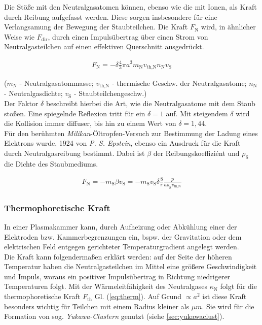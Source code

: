 \documentclass[numbers=noenddot,a4paper]{scrartcl}
\newcommand{\ix}[1]{_\text{#1}}
\newcommand{\tilt}[1]{\textit{#1}}
\begin{document}
				Die Stöße mit den Neutralgasatomen können, ebenso wie die mit Ionen, als Kraft durch Reibung aufgefasst werden. Diese sorgen insbesondere für eine Verlangsamung der Bewegung der Staubteilchen. Die Kraft $F\ix{N}$ wird, in ähnlicher Weise wie $F\ix{dir}$, durch einen Impulsübertrag über einen Strom von Neutralgasteilchen auf einen effektiven Querschnitt ausgedrückt.
				
					\begin{align}
						F\ix{N}=-\delta\frac{4}{3}\pi a^3m\ix{N}v\ix{th,N}n\ix{N}v\ix{S}
					\end{align}
					
				($m\ix{N}$ - Neutralgasatommasse; $v\ix{th,N}$ - thermische Geschw. der Neutralgasatome; $n\ix{N}$ - Neutralgasdichte; $v\ix{S}$ - Staubteilchengeschw.)\\
				Der Faktor $\delta$ beschreibt hierbei die Art, wie die Neutralgasatome mit dem Staub stoßen. Eine spiegelnde Reflexion tritt für ein $\delta=1$ auf. Mit steigendem $\delta$ wird die Kollision immer diffuser, bis hin zu einem Wert von $\delta=1,44$.\\
				Für den berühmten \tilt{Milikan}-Öltropfen-Versuch zur Bestimmung der Ladung eines Elektrons wurde, 1924 von \tilt{P. S. Epstein}, ebenso ein Ausdruck für die Kraft durch Neutralgasreibung bestimmt. Dabei ist $\beta$ der Reibungskoeffiziént und $\rho\ix{S}$ die Dichte des Staubmediums.
				
					\begin{align}
						F\ix{N}=-m\ix{S}\beta v\ix{S}=-m\ix{S}v\ix{S}\delta\frac{8}{\pi}\frac{p}{a\rho\ix{S}v\ix{th,N}}
					\end{align}
					
			\subsubsection{Thermophoretische Kraft}\label{subsub:therm}
	
				In einer Plasmakammer kann, durch Aufheizung oder Abkühlung einer der Elektroden bzw. Kammerbegrenzungen ein, bspw. der Gravitation oder dem elektrischen Feld entgegen gerichteter Temperaturgradient angelegt werden.\\
				Die Kraft kann folgendermaßen erklärt werden: auf der Seite der höheren Temperatur haben die Neutralgasteilchen im Mittel eine größere Geschwindigkeit und Impuls, woraus ein positiver Impulsübertrag in Richtung niedrigerer Temperaturen folgt.	Mit der Wärmeleitfähigkeit des Neutralgases $\kappa\ix{N}$ folgt für die thermophoretische Kraft $F\ix{th}$ Gl. (\ref{eq:therm}). Auf Grund $\propto a^2$ ist diese Kraft besonders wichtig für Teilchen mit einem Radius kleiner als $\unit{\mu m}$. Sie wird für die Formation von sog. \tilt{Yukawa-Clustern} genutzt (siehe \ref{sec:yukawaclust}).
				
\end{document}
